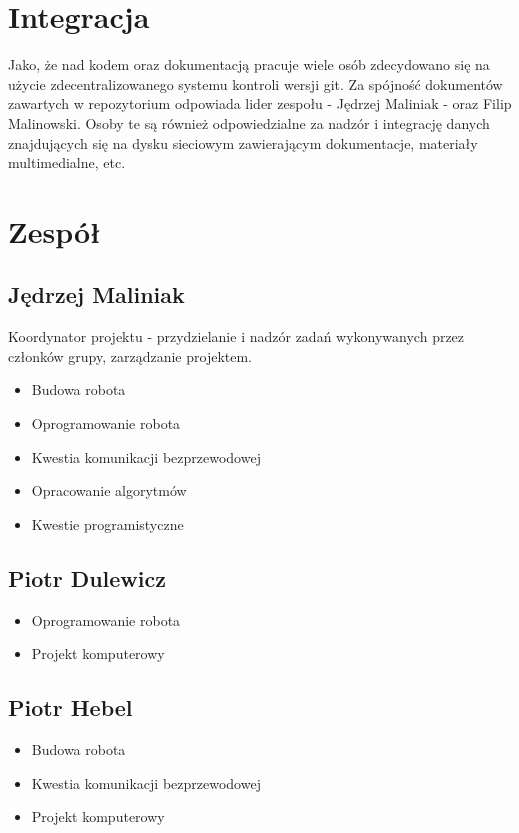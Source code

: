 \documentclass[a4paper]{article}
\begin{document}
\section{Integracja}
    Jako, że nad kodem oraz dokumentacją pracuje wiele osób zdecydowano się na użycie zdecentralizowanego systemu kontroli wersji git. Za spójność dokumentów zawartych w repozytorium odpowiada lider zespołu - Jędrzej Maliniak - oraz Filip Malinowski. Osoby te są również odpowiedzialne za nadzór i integrację danych znajdujących się na dysku sieciowym zawierającym dokumentacje, materiały multimedialne, etc. 
\section{Zespół}
    \subsection{Jędrzej Maliniak}
    Koordynator projektu - przydzielanie i nadzór zadań wykonywanych przez członków grupy, zarządzanie projektem.
        \begin{itemize}
            \item Budowa robota
            \item Oprogramowanie robota
            \item Kwestia komunikacji bezprzewodowej
            \item Opracowanie algorytmów
            \item Kwestie programistyczne
        \end{itemize}
    \subsection{Piotr Dulewicz}
        \begin{itemize}
            \item Oprogramowanie robota
            \item Projekt komputerowy
        \end{itemize}
    \subsection{Piotr Hebel}
        \begin{itemize}
            \item Budowa robota
            \item Kwestia komunikacji bezprzewodowej
            \item Projekt komputerowy
        \end{itemize}
\end{document}
